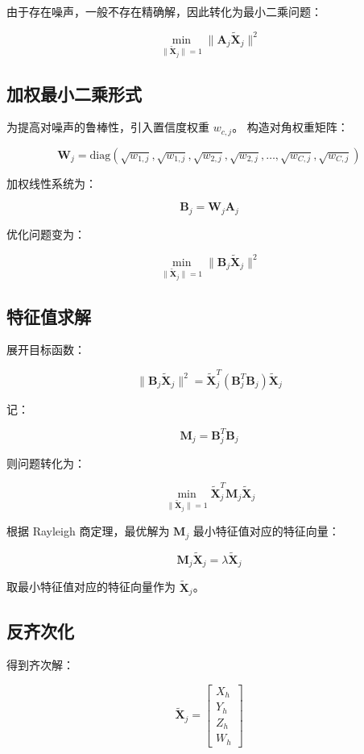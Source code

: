 由于存在噪声，一般不存在精确解，因此转化为最小二乘问题：

\[
\min_{\|\tilde{\mathbf{X}}_j\|=1}
\| \mathbf{A}_j \tilde{\mathbf{X}}_j \|^2
\]

\subsection{加权最小二乘形式}

为提高对噪声的鲁棒性，引入置信度权重 $w_{c,j}$。
构造对角权重矩阵：

\[
\mathbf{W}_j =
\mathrm{diag}(
\sqrt{w_{1,j}}, \sqrt{w_{1,j}},
\sqrt{w_{2,j}}, \sqrt{w_{2,j}},
\ldots,
\sqrt{w_{C,j}}, \sqrt{w_{C,j}}
)
\]

加权线性系统为：

\[
\mathbf{B}_j = \mathbf{W}_j \mathbf{A}_j
\]

优化问题变为：

\[
\min_{\|\tilde{\mathbf{X}}_j\|=1}
\| \mathbf{B}_j \tilde{\mathbf{X}}_j \|^2
\]

\subsection{特征值求解}

展开目标函数：

\[
\| \mathbf{B}_j \tilde{\mathbf{X}}_j \|^2
=
\tilde{\mathbf{X}}_j^T
(\mathbf{B}_j^T \mathbf{B}_j)
\tilde{\mathbf{X}}_j
\]

记：

\[
\mathbf{M}_j = \mathbf{B}_j^T \mathbf{B}_j
\]

则问题转化为：

\[
\min_{\|\tilde{\mathbf{X}}_j\|=1}
\tilde{\mathbf{X}}_j^T \mathbf{M}_j \tilde{\mathbf{X}}_j
\]

根据 Rayleigh 商定理，最优解为 $\mathbf{M}_j$ 最小特征值对应的特征向量：

\[
\mathbf{M}_j \tilde{\mathbf{X}}_j = \lambda \tilde{\mathbf{X}}_j
\]

取最小特征值对应的特征向量作为 $\tilde{\mathbf{X}}_j$。

\subsection{反齐次化}

得到齐次解：

\[
\tilde{\mathbf{X}}_j =
\begin{bmatrix}
X_h \\
Y_h \\
Z_h \\
W_h
\end{bmatrix}
\]

